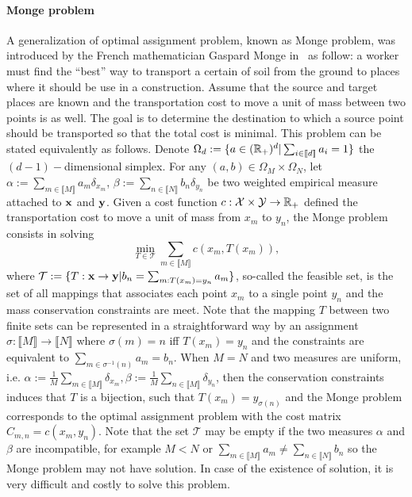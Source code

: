\paragraph{Monge problem}
A generalization of optimal assignment problem, known as Monge problem, was introduced by the French mathematician Gaspard Monge in~\cite{monge1781} as follow:  a worker must find the ``best'' way to transport a certain of soil from the ground to places where it should be use in a construction. Assume that the source and target places are known and the transportation cost to move a unit of mass between two points is as well. The goal is to determine the destination to which a source point should be transported so that the total cost is minimal. This problem can be stated equivalently as follows. Denote $\Omega_{d}  := \{ a \in (\mathbb{R}_+)^d | \sum_{i \in \llbracket d \rrbracket} a_i = 1\}$  the $(d-1)-$dimensional simplex.  For any $(a, b) \in \Omega_M \times \Omega_N$,  let $\alpha := \sum_{m\in \llbracket M \rrbracket} a_m \delta_{x_m}$, $\beta := \sum_{n\in \llbracket N \rrbracket} b_n \delta_{y_n}$ be two weighted empirical measure attached to $\textbf{x}$ and $\textbf{y}$. Given a cost function $c: \mathcal{X} \times \mathcal{Y} \rightarrow \mathbb{R}_{+}$ defined the transportation cost to move a unit of mass from $x_m$ to $y_n$, the Monge problem consists in solving 
\begin{equation}
\label{chap0:eq:eq0}
\min_{T\in \mathcal{T}} \sum_{m \in \llbracket M \rrbracket}  c(x_m, T(x_m)),
\end{equation}
where $\mathcal{T} := \{ T : \textbf{x} \rightarrow \textbf{y} |  b_n = \sum_{m: T(x_m) = y_n} a_m \}$, so-called the feasible set,  is the set of all mappings that associates each point $x_m$ to a single point $y_n$ and the mass conservation constraints are meet. Note that the mapping $T$ between two finite sets can be represented in a straightforward way by an assignment $\sigma: \llbracket M \rrbracket \rightarrow \llbracket N \rrbracket$ where $\sigma(m) = n$ iff $T(x_m) = y_n$ and the constraints are equivalent to $\sum_{m \in \sigma^{-1}(n)} a_m = b_n$. 
When $M=N$ and two measures are uniform, i.e. $\alpha := \tfrac{1}{M} \sum_{m \in \llbracket M \rrbracket} \delta_{x_m}, \beta:= \tfrac{1}{M} \sum_{n \in \llbracket M \rrbracket} \delta_{y_n}$, then the conservation constraints induces that $T$ is a bijection, such that $T(x_m) = y_{\sigma(n)}$ and the Monge problem corresponds to the optimal assignment problem with the cost matrix $C_{m, n} = c(x_m, y_n)$. Note that the set $\mathcal{T}$ may be empty if the two measures $\alpha$ and $\beta$ are incompatible, for example $M<N$ or $\sum_{m \in \llbracket M \rrbracket} a_m \neq \sum_{n \in \llbracket N \rrbracket} b_n$ so the Monge problem may not have solution. In case of the existence of solution, it is very difficult and costly to solve this problem. 

